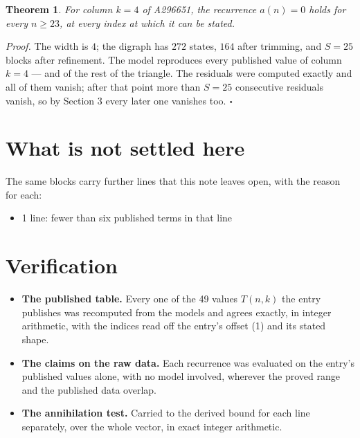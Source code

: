\documentclass[11pt]{article}
\newtheorem{theorem}{Theorem}
\theoremstyle{definition}
\begin{document}
\begin{theorem} For column $k = 4$ of A296651, the recurrence $a(n) = 0$ holds for every $n \ge 23$, at every index at which it can be stated.\end{theorem}

{\itshape Proof.} The width is $4$; the digraph has $272$ states, $164$ after trimming, and $S = 25$ blocks after refinement. The model reproduces every published value of column $k = 4$ --- and of the rest of the triangle. The residuals were computed exactly and all of them vanish; after that point more than $S = 25$ consecutive residuals vanish, so by Section 3 every later one vanishes too. $\square$

\section{What is not settled here}

The same blocks carry further lines that this note leaves open, with the reason for each:

\begin{itemize}

\item 1 line: fewer than six published terms in that line

\end{itemize}

\section{Verification}

\begin{itemize}

\item {\bfseries The published table.} Every one of the 49 values $T(n,k)$ the entry publishes was recomputed from the models and agrees exactly, in integer arithmetic, with the indices read off the entry's offset (1) and its stated shape.

\item {\bfseries The claims on the raw data.} Each recurrence was evaluated on the entry's published values alone, with no model involved, wherever the proved range and the published data overlap.

\item {\bfseries The annihilation test.} Carried to the derived bound for each line separately, over the whole vector, in exact integer arithmetic.

\end{itemize}
\end{document}
